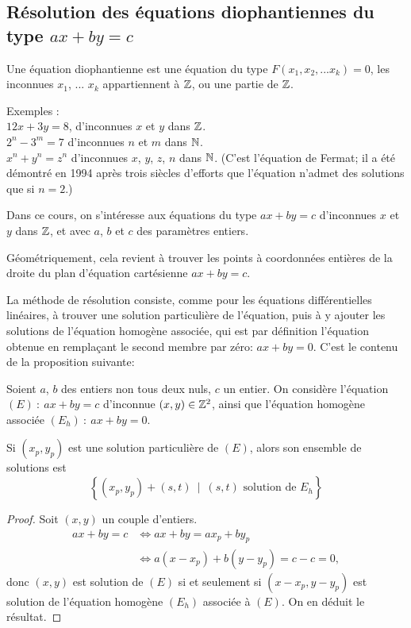 \subsection{Résolution des équations diophantiennes du type $ax+by=c$}


\begin{definition}
Une équation diophantienne est une équation du type $F(x_1, x_2, ...x_k)=0$, les inconnues $x_1$, ... $x_k$ appartiennent à $\mathbb{Z}$, ou une partie de $\mathbb{Z}$.
\end{definition}

Exemples :\\
$12x+3y=8$, d'inconnues $x$ et $y$ dans $\mathbb{Z}$.\\
$2^n-3^m=7$ d'inconnues $n$ et $m$ dans $\mathbb{N}$.\\
$x^n+y^n=z^n$ d'inconnues $x$, $y$, $z$, $n$ dans $\mathbb{N}$. (C'est l'équation de Fermat; il a été démontré en 1994 après trois siècles d'efforts que l'équation n'admet des solutions que si $n=2$.)

Dans ce cours, on s'intéresse aux équations du type $ax+by=c$ d'inconnues $x$ et $y$ dans $\mathbb{Z}$, et avec $a$, $b$ et $c$ des paramètres entiers. 

Géométriquement, cela revient à trouver les points à coordonnées entières de la droite du plan d'équation cartésienne $ax+by=c$.

La méthode de résolution consiste, comme pour les équations différentielles linéaires, à trouver une solution particulière de l'équation, puis à y ajouter les solutions de l'équation homogène associée, qui est par définition l'équation obtenue en remplaçant le second membre par zéro: $ax+by=0$. C'est le contenu de la proposition suivante:

\begin{proposition}
Soient $a$, $b$ des entiers non tous deux  nuls, $c$ un entier. On considère l'équation $(E) \: : \: ax+by=c$ d'inconnue $(x,y)\in \mathbb{Z}^2$, ainsi que l'équation homogène associée $(E_h) \: : \: ax+by=0$. 

Si $(x_p,y_p)$ est une solution particulière de $(E)$, alors son ensemble de solutions est 
\[
\left\{(x_p,y_p) + (s,t)\:\mid\: (s,t) \text{ solution de } E_h\right\}
\]
\end{proposition}

\begin{proof}
Soit $(x,y)$ un couple d'entiers. 
\begin{align*}
ax+by=c 
&\iff ax+by = ax_p+by_p\\
&\iff a(x-x_p) + b(y-y_p) = c-c=0,
\end{align*}
donc $(x,y)$ est solution de $(E)$ si et seulement si $(x-x_p,y-y_p)$ est solution de l'équation homogène $(E_h)$ associée à $(E)$. On en déduit le résultat.
\end{proof}

